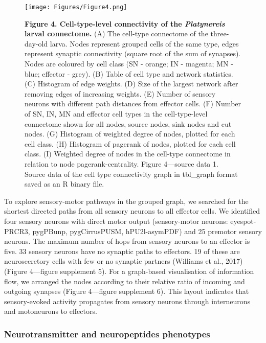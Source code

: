 \documentclass[
  11pt,
]{article}
\begin{document}
\begin{figure}[H]

{\centering \texttt{[image: Figures/Figure4.png]}

}

\caption{\textbf{Figure 4. Cell-type-level connectivity of the
\emph{Platynereis} larval connectome.} (A) The cell-type connectome of
the three-day-old larva. Nodes represent grouped cells of the same type,
edges represent synaptic connectivity (square root of the sum of
synapses). Nodes are coloured by cell class (SN - orange; IN - magenta;
MN - blue; effector - grey). (B) Table of cell type and network
statistics. (C) Histogram of edge weights. (D) Size of the largest
network after removing edges of increasing weights. (E) Number of
sensory neurons with different path distances from effector cells. (F)
Number of SN, IN, MN and effector cell types in the cell-type-level
connectome shown for all nodes, source nodes, sink nodes and cut nodes.
(G) Histogram of weighted degree of nodes, plotted for each cell class.
(H) Histogram of pagerank of nodes, plotted for each cell class. (I)
Weighted degree of nodes in the cell-type connectome in relation to node
pagerank-centrality. Figure 4---source data 1. Source data of the cell
type connectivity graph in tbl\_graph format saved as an R binary file.}

\end{figure}%

To explore sensory-motor pathways in the grouped graph, we searched for
the shortest directed paths from all sensory neurons to all effector
cells. We identified four sensory neurons with direct motor output
(sensory-motor neurons: eyespot-PRCR3, pygPBunp, pygCirrusPUSM,
hPU2l-asymPDF) and 25 premotor sensory neurons. The maximum number of
hops from sensory neurons to an effector is five. 33 sensory neurons
have no synaptic paths to effectors. 19 of these are neurosecretory
cells with few or no synaptic partners (Williams et al., 2017) (Figure
4---figure supplement 5). For a graph-based visualisation of information
flow, we arranged the nodes according to their relative ratio of
incoming and outgoing synapses (Figure 4---figure supplement 6). This
layout indicates that sensory-evoked activity propagates from sensory
neurons through interneurons and motoneurons to effectors.

\subsubsection{Neurotransmitter and neuropeptides
phenotypes}\label{neurotransmitter-and-neuropeptides-phenotypes}
\end{document}
